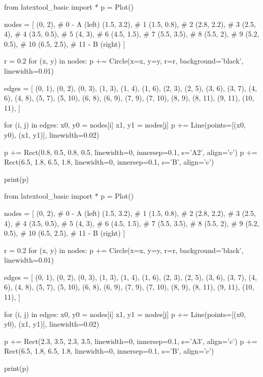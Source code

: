 \begin{python}
from latextool_basic import *
p = Plot()

nodes = [
    (0, 2),      # 0 - A (left)
    (1.5, 3.2),  # 1
    (1.5, 0.8),  # 2
    (2.8, 2.2),  # 3
    (2.5, 4),    # 4
    (3.5, 0.5),  # 5
    (4, 3),      # 6
    (4.5, 1.5),  # 7
    (5.5, 3.5),  # 8
    (5.5, 2),    # 9
    (5.2, 0.5),  # 10
    (6.5, 2.5),  # 11 - B (right)
]

r = 0.2
for (x, y) in nodes:
    p += Circle(x=x, y=y, r=r, background='black', linewidth=0.01)

edges = [
    (0, 1), (0, 2), (0, 3),
    (1, 3), (1, 4), (1, 6),
    (2, 3), (2, 5),
    (3, 6), (3, 7),
    (4, 6), (4, 8),
    (5, 7), (5, 10),
    (6, 8), (6, 9),
    (7, 9), (7, 10),
    (8, 9), (8, 11),
    (9, 11),
    (10, 11),
]

for (i, j) in edges:
    x0, y0 = nodes[i]
    x1, y1 = nodes[j]
    p += Line(points=[(x0, y0), (x1, y1)], linewidth=0.02)

p += Rect(0.8, 0.5, 0.8, 0.5, linewidth=0, innersep=0.1, s='A2', align='c')
p += Rect(6.5, 1.8, 6.5, 1.8, linewidth=0, innersep=0.1, s='B', align='c')

print(p)
\end{python}

\begin{python}
from latextool_basic import *
p = Plot()

nodes = [
    (0, 2),      # 0 - A (left)
    (1.5, 3.2),  # 1
    (1.5, 0.8),  # 2
    (2.8, 2.2),  # 3
    (2.5, 4),    # 4
    (3.5, 0.5),  # 5
    (4, 3),      # 6
    (4.5, 1.5),  # 7
    (5.5, 3.5),  # 8
    (5.5, 2),    # 9
    (5.2, 0.5),  # 10
    (6.5, 2.5),  # 11 - B (right)
]

r = 0.2
for (x, y) in nodes:
    p += Circle(x=x, y=y, r=r, background='black', linewidth=0.01)

edges = [
    (0, 1), (0, 2), (0, 3),
    (1, 3), (1, 4), (1, 6),
    (2, 3), (2, 5),
    (3, 6), (3, 7),
    (4, 6), (4, 8),
    (5, 7), (5, 10),
    (6, 8), (6, 9),
    (7, 9), (7, 10),
    (8, 9), (8, 11),
    (9, 11),
    (10, 11),
]

for (i, j) in edges:
    x0, y0 = nodes[i]
    x1, y1 = nodes[j]
    p += Line(points=[(x0, y0), (x1, y1)], linewidth=0.02)

p += Rect(2.3, 3.5, 2.3, 3.5, linewidth=0, innersep=0.1, s='A3', align='c')
p += Rect(6.5, 1.8, 6.5, 1.8, linewidth=0, innersep=0.1, s='B', align='c')

print(p)
\end{python}


